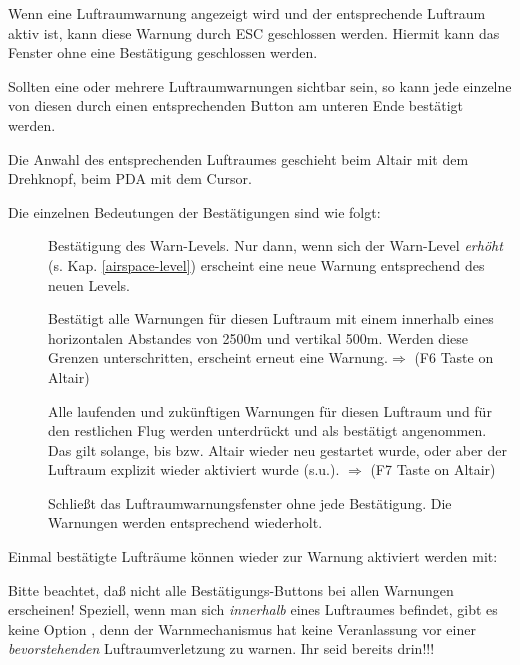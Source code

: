 Wenn eine Luftraumwarnung angezeigt wird und der entsprechende
Luftraum aktiv ist, kann diese Warnung durch ESC geschlossen werden.
Hiermit kann das Fenster ohne eine Bestätigung geschlossen werden.


Sollten eine oder mehrere Luftraumwarnungen sichtbar sein,
so kann jede einzelne von diesen durch einen entsprechenden Button
am unteren Ende bestätigt werden.

Die Anwahl des entsprechenden Luftraumes geschieht beim Altair mit dem
Drehknopf, beim PDA mit dem Cursor.

Die einzelnen Bedeutungen der Bestätigungen sind wie folgt:


\begin{description}
\item[] Bestätigung des Warn-Levels. Nur dann,
wenn sich der Warn-Level \textsl{erhöht} (s. Kap. \ref{airspace-level}) erscheint
eine neue Warnung entsprechend des neuen Levels.

\item[]  Bestätigt alle Warnungen für diesen Luftraum mit einem
innerhalb eines horizontalen Abstandes von 2500m und vertikal 500m.
Werden diese  Grenzen unterschritten, erscheint erneut eine Warnung.$\Rightarrow$  (F6 Taste on Altair)

\item[]  Alle laufenden und zukünftigen Warnungen für diesen Luftraum
und für den restlichen Flug werden unterdrückt und als bestätigt angenommen.
Das gilt solange, bis \xc bzw. Altair  wieder neu gestartet wurde, oder aber der
Luftraum explizit wieder aktiviert wurde (s.u.). $\Rightarrow$  (F7 Taste on Altair)

\item[] Schließt das Luftraumwarnungsfenster ohne jede Bestätigung.
Die Warnungen werden entsprechend wiederholt.
\end{description}

Einmal bestätigte Lufträume können  wieder zur Warnung aktiviert werden mit:

\blink{}\blink{}\blink{}

Bitte beachtet, daß nicht alle Bestätigungs-Buttons bei allen Warnungen erscheinen!
Speziell, wenn man sich \textsl{innerhalb} eines Luftraumes befindet, gibt es keine Option
, denn der Warnmechanismus hat keine Veranlassung
vor einer \textsl{bevorstehenden} Luftraumverletzung zu warnen.
Ihr seid bereits drin!!!

